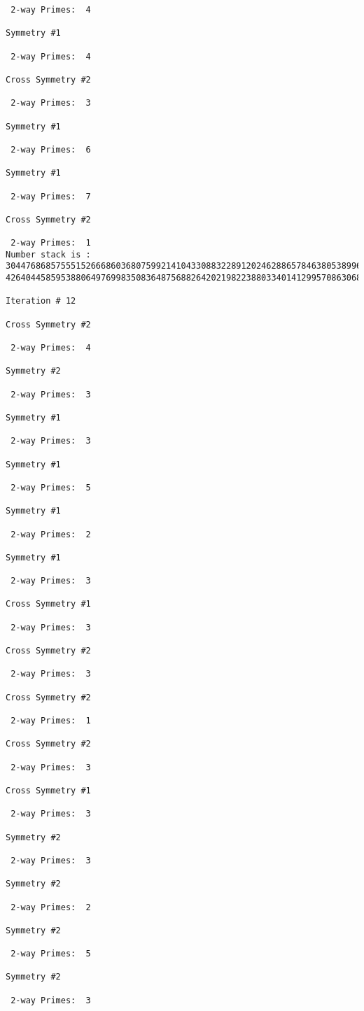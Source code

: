 \begin{verbatim}
 2-way Primes: 	4

Symmetry #1

 2-way Primes: 	4

Cross Symmetry #2

 2-way Primes: 	3

Symmetry #1

 2-way Primes: 	6

Symmetry #1

 2-way Primes: 	7

Cross Symmetry #2

 2-way Primes: 	1
Number stack is :
30447686857555152666860368075992141043308832289120246288657846380538996794608835958544046240163340857
42640445859538806497699835083648756882642021982238803340141299570863068666251555758686744037580433610

Iteration #	12

Cross Symmetry #2

 2-way Primes: 	4

Symmetry #2

 2-way Primes: 	3

Symmetry #1

 2-way Primes: 	3

Symmetry #1

 2-way Primes: 	5

Symmetry #1

 2-way Primes: 	2

Symmetry #1

 2-way Primes: 	3

Cross Symmetry #1

 2-way Primes: 	3

Cross Symmetry #2

 2-way Primes: 	3

Cross Symmetry #2

 2-way Primes: 	1

Cross Symmetry #2

 2-way Primes: 	3

Cross Symmetry #1

 2-way Primes: 	3

Symmetry #2

 2-way Primes: 	3

Symmetry #2

 2-way Primes: 	2

Symmetry #2

 2-way Primes: 	5

Symmetry #2

 2-way Primes: 	3


\end{verbatim}

